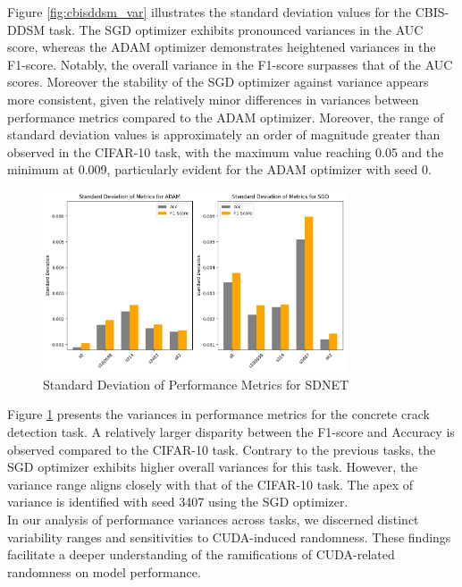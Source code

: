 Figure \ref{fig:cbisddsm_var} illustrates the standard deviation values for the CBIS-DDSM task. The SGD optimizer exhibits pronounced variances in the AUC score, whereas the ADAM optimizer demonstrates heightened variances in the F1-score. Notably, the overall variance in the F1-score surpasses that of the AUC scores. Moreover the stability of the SGD optimizer against variance appears more consistent, given the relatively minor differences in variances between performance metrics compared to the ADAM optimizer. Moreover, the range of standard deviation values is approximately an order of magnitude greater than observed in the CIFAR-10 task, with the maximum value reaching 0.05 and the minimum at 0.009, particularly evident for the ADAM optimizer with seed 0.\\

\begin{figure}[h!]
  \centering
  \includegraphics[width=0.8\textwidth]{figures/crack_results_std.png}
  \caption{Standard Deviation of Performance Metrics for SDNET}
  \label{fig:sdnet_var}
\end{figure}

Figure \ref{fig:sdnet_var} presents the variances in performance metrics for the concrete crack detection task. A relatively larger disparity between the F1-score and Accuracy is observed compared to the CIFAR-10 task. Contrary to the previous tasks, the SGD optimizer exhibits higher overall variances for this task. However, the variance range aligns closely with that of the CIFAR-10 task. The apex of variance is identified with seed 3407 using the SGD optimizer.\\

In our analysis of performance variances across tasks, we discerned distinct variability ranges and sensitivities to CUDA-induced randomness. These findings facilitate a deeper understanding of the ramifications of CUDA-related randomness on model performance.\\

